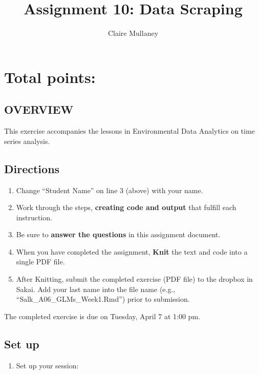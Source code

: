 \documentclass[]{article}
\title{Assignment 10: Data Scraping}
\author{Claire Mullaney}
\date{}
\providecommand{\tightlist}{%
  \setlength{\itemsep}{0pt}\setlength{\parskip}{0pt}}
\begin{document}
\maketitle

\hypertarget{total-points}{%
\section{Total points:}\label{total-points}}

\hypertarget{overview}{%
\subsection{OVERVIEW}\label{overview}}

This exercise accompanies the lessons in Environmental Data Analytics on
time series analysis.

\hypertarget{directions}{%
\subsection{Directions}\label{directions}}

\begin{enumerate}
\def\labelenumi{\arabic{enumi}.}
\tightlist
\item
  Change ``Student Name'' on line 3 (above) with your name.
\item
  Work through the steps, \textbf{creating code and output} that fulfill
  each instruction.
\item
  Be sure to \textbf{answer the questions} in this assignment document.
\item
  When you have completed the assignment, \textbf{Knit} the text and
  code into a single PDF file.
\item
  After Knitting, submit the completed exercise (PDF file) to the
  dropbox in Sakai. Add your last name into the file name (e.g.,
  ``Salk\_A06\_GLMs\_Week1.Rmd'') prior to submission.
\end{enumerate}

The completed exercise is due on Tuesday, April 7 at 1:00 pm.

\hypertarget{set-up}{%
\subsection{Set up}\label{set-up}}

\begin{enumerate}
\def\labelenumi{\arabic{enumi}.}
\tightlist
\item
  Set up your session:
\end{enumerate}
\end{document}
